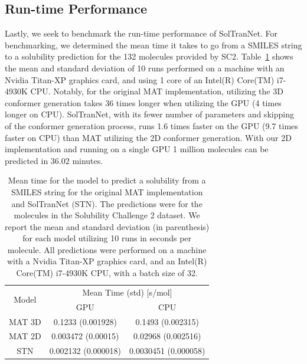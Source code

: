 \documentclass[journal=jmcmar,manuscript=article]{achemso}
\begin{document}
\subsection{Run-time Performance}

Lastly, we seek to benchmark the run-time performance of SolTranNet.
For benchmarking, we determined the mean time it takes to go from a SMILES string to a solubility prediction for the 132 molecules provided by SC2.
Table~\ref{tab:timings} shows the mean and standard deviation of 10 runs performed on a machine with an Nvidia Titan-XP graphics card, and using 1 core of an Intel(R) Core(TM) i7-4930K CPU.
Notably, for the original MAT implementation, utilizing the 3D conformer generation takes 36 times longer when utilizing the GPU (4 times longer on CPU).
SolTranNet, with its fewer number of parameters and skipping of the conformer generation process, runs 1.6 times faster on the GPU (9.7 times faster on CPU) than MAT utilizing the 2D conformer generation.
With our 2D implementation and running on a single GPU 1 million molecules can be predicted in 36.02 minutes.


\begin{table}
    \begin{tabular}{|c|c|c|}
        \hline
        \multirow{2}{*}{Model}    & \multicolumn{2}{c|}{Mean Time (std) [s/mol]} \\ 
        \cline{2-3}
          &  GPU & CPU \\
         \hline
         MAT 3D & 0.1233 (0.001928) & 0.1493 (0.002315) \\
         MAT 2D & 0.003472 (0.00015) & 0.02968 (0.002516) \\
         STN & 0.002132 (0.000018) & 0.0030451 (0.000058)\\
         \hline
    \end{tabular}
    \caption{Mean time for the model to predict a solubility from a SMILES string for the original MAT implementation and SolTranNet (STN). The predictions were for the molecules in the Solubility Challenge 2 dataset. We report the mean and standard deviation (in parenthesis) for each model utilizing 10 runs in seconds per molecule. All predictions were performed on a machine with a Nvidia Titan-XP graphics card, and an Intel(R) Core(TM) i7-4930K CPU, with a batch size of 32.}
    \label{tab:timings}
\end{table}
\end{document}
